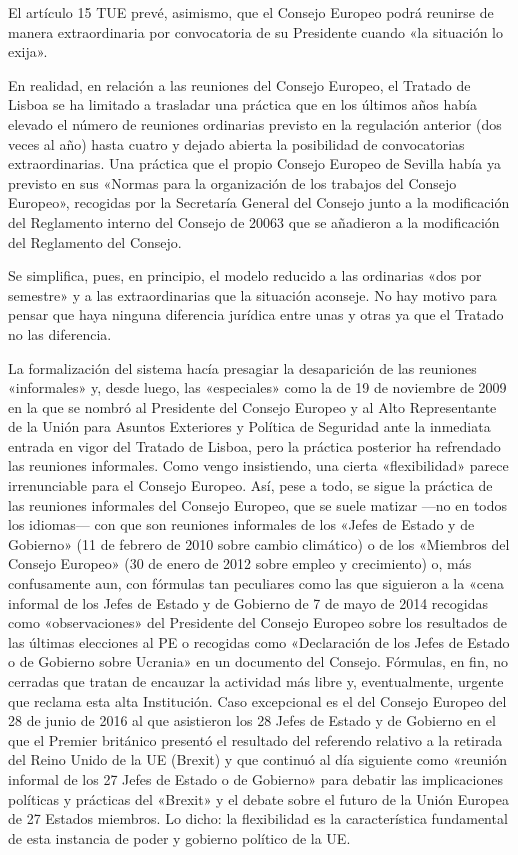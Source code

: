 \documentclass[10pt,a4paper]{article}
\begin{document}
El artículo 15 TUE prevé, asimismo, que el Consejo Europeo podrá reunirse de manera extraordinaria por convocatoria de su Presidente cuando «la situación lo exija».

En realidad, en relación a las reuniones del Consejo Europeo, el Tratado de Lisboa se ha limitado a trasladar una práctica que en los últimos años había elevado el número de reuniones ordinarias previsto en la regulación anterior (dos veces al año) hasta cuatro y dejado abierta la posibilidad de convocatorias extraordinarias. Una práctica que el propio Consejo Europeo de Sevilla había ya previsto en sus «Normas para la organización de los trabajos del Consejo Europeo», recogidas por la Secretaría General del Consejo junto a la modificación del Reglamento interno del Consejo de 20063 que se añadieron a la modificación del Reglamento del Consejo.

Se simplifica, pues, en principio, el modelo reducido a las ordinarias «dos por semestre» y a las extraordinarias que la situación aconseje. No hay motivo para pensar que haya ninguna diferencia jurídica entre unas y otras ya que el Tratado no las diferencia.

La formalización del sistema hacía presagiar la desaparición de las reuniones «informales» y, desde luego, las «especiales» como la de 19 de noviembre de 2009 en la que se nombró al Presidente del Consejo Europeo y al Alto Representante de la Unión para Asuntos Exteriores y Política de Seguridad ante la inmediata entrada en vigor del Tratado de Lisboa, pero la práctica posterior ha refrendado las reuniones informales. Como vengo insistiendo, una cierta «flexibilidad» parece irrenunciable para el Consejo Europeo. Así, pese a todo, se sigue la práctica de las reuniones informales del Consejo Europeo, que se suele matizar —no en todos los idiomas— con que son reuniones informales de los «Jefes de Estado y de Gobierno» (11 de febrero de 2010 sobre cambio climático) o de los «Miembros del Consejo Europeo» (30 de enero de 2012 sobre empleo y crecimiento) o, más confusamente aun, con fórmulas tan peculiares como las que siguieron a la «cena informal de los Jefes de Estado y de Gobierno de 7 de mayo de 2014 recogidas como «observaciones» del Presidente del Consejo Europeo sobre los resultados de las últimas elecciones al PE o recogidas como «Declaración de los Jefes de Estado o de Gobierno sobre Ucrania» en un documento del Consejo. Fórmulas, en fin, no cerradas que tratan de encauzar la actividad más libre y, eventualmente, urgente que reclama esta alta Institución. Caso excepcional es el del Consejo Europeo del 28 de junio de 2016 al que asistieron los 28 Jefes de Estado y de Gobierno en el que el Premier británico presentó el resultado del referendo relativo a la retirada del Reino Unido de la UE (Brexit) y que continuó al día siguiente como «reunión informal de los 27 Jefes de Estado o de Gobierno» para debatir las implicaciones políticas y prácticas del «Brexit» y el debate sobre el futuro de la Unión Europea de 27 Estados miembros. Lo dicho: la flexibilidad es la característica fundamental de esta instancia de poder y gobierno político de la UE.
\end{document}
